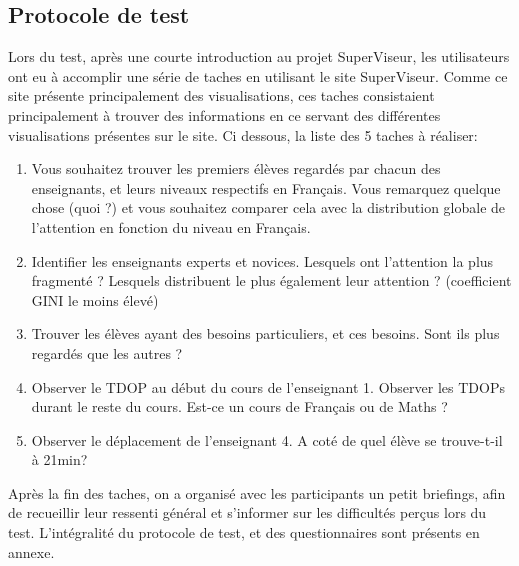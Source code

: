 \documentclass{article}
\begin{document}
\subsection{Protocole de test}
Lors du test, après une courte introduction au projet SuperViseur, les utilisateurs ont eu à accomplir une série de taches en utilisant le site SuperViseur. Comme ce site présente principalement des visualisations, ces taches consistaient principalement à trouver des informations en ce servant des différentes visualisations présentes sur le site. Ci dessous, la liste des 5 taches à réaliser:
\begin{enumerate}
    \item Vous souhaitez trouver les premiers élèves regardés par chacun des enseignants, et leurs niveaux respectifs en Français. Vous remarquez quelque chose (quoi ?) et vous souhaitez comparer cela avec la distribution globale de l'attention en fonction du niveau en Français.
    \item Identifier les enseignants experts et novices. Lesquels ont l'attention la plus fragmenté ? Lesquels distribuent le plus également leur attention ? (coefficient GINI le moins élevé)
    \item Trouver les élèves ayant des besoins particuliers, et ces besoins. Sont ils plus regardés que les autres ?
    \item Observer le TDOP au début du cours de l'enseignant 1. Observer les TDOPs durant le reste du cours. Est-ce un cours de Français ou de Maths ?
    \item Observer le déplacement de l'enseignant 4. A coté de quel élève se trouve-t-il à 21min?
\end{enumerate}
Après la fin des taches, on a organisé avec les participants un petit briefings, afin de recueillir leur ressenti général et s'informer sur les difficultés perçus lors du test.
L'intégralité du protocole de test, et des questionnaires sont présents en annexe.
\end{document}
